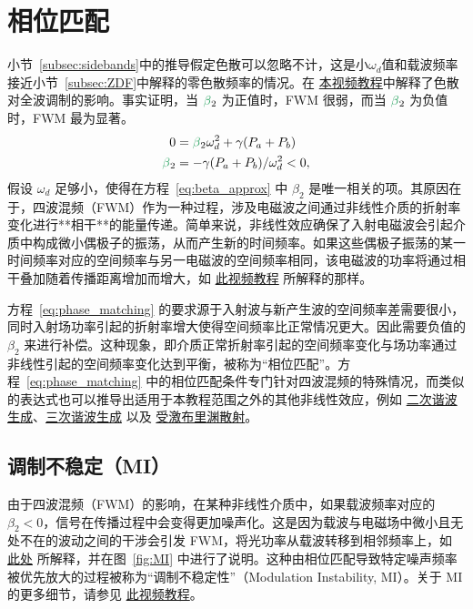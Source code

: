 \section{相位匹配}
\label{sec:Phase_matching}
小节~\ref{subsec:sidebands}中的推导假定色散可以忽略不计，这是小$\omega_d$值和载波频率接近小节~\ref{subsec:ZDF}中解释的零色散频率的情况。在 \href{https://youtu.be/0SXPvO89jto}{本视频教程}中解释了色散对全波调制的影响。事实证明，当 $\betag_2$ 为正值时，FWM 很弱，而当 $\betag_2$ 为负值时，FWM 最为显著。
\begin{align}
\label{eq:phase_matching}
0&=\betag_2\omega_d^2+\gamma(P_a+P_b)    \\ \nonumber
\betag_2&=-\gamma(P_a+P_b)/\omega_d^2<0,    
\end{align}
假设 $\omega_d$ 足够小，使得在方程~\ref{eq:beta_approx} 中 $\beta_2$ 是唯一相关的项。其原因在于，四波混频（FWM）作为一种过程，涉及电磁波之间通过非线性介质的折射率变化进行**相干**的能量传递。简单来说，非线性效应确保了入射电磁波会引起介质中构成微小偶极子的振荡，从而产生新的时间频率。如果这些偶极子振荡的某一时间频率对应的空间频率与另一电磁波的空间频率相同，该电磁波的功率将通过相干叠加随着传播距离增加而增大，如 \href{https://youtu.be/bha8SzWzRc4}{此视频教程} 所解释的那样。

方程~\ref{eq:phase_matching} 的要求源于入射波与新产生波的空间频率差需要很小，同时入射场功率引起的折射率增大使得空间频率比正常情况更大。因此需要负值的 $\beta_2$ 来进行补偿。这种现象，即介质正常折射率引起的空间频率变化与场功率通过非线性引起的空间频率变化达到平衡，被称为“相位匹配”。方程~\ref{eq:phase_matching} 中的相位匹配条件专门针对四波混频的特殊情况，而类似的表达式也可以推导出适用于本教程范围之外的其他非线性效应，例如 \href{https://www.youtube.com/watch?v=UpuN0dS23Nw}{二次谐波生成}、\href{https://youtu.be/bha8SzWzRc4}{三次谐波生成} 以及 \href{https://www.creol.ucf.edu/mir/wp-content/uploads/sites/7/2023/07/L22_-Stimulated-Brillouin-scattering.pdf}{受激布里渊散射}。
\subsection{调制不稳定（MI）}
由于四波混频（FWM）的影响，在某种非线性介质中，如果载波频率对应的 $\beta_2<0$，信号在传播过程中会变得更加噪声化。这是因为载波与电磁场中微小且无处不在的波动之间的干涉会引发 FWM，将光功率从载波转移到相邻频率上，如 \href{https://prefetch.eu/know/concept/modulational-instability/}{此处} 所解释，并在图~\ref{fig:MI} 中进行了说明。这种由相位匹配导致特定噪声频率被优先放大的过程被称为“调制不稳定性”（Modulation Instability, MI）。关于 MI 的更多细节，请参见 \href{https://youtu.be/VtaoPd0Fwj8}{此视频教程}。

